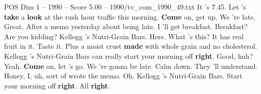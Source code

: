 \begin{textsample}{POS Dim 1 – 1990 – Score 5.00 – 1990/tv\_com\_1990\_49.txt}  \label{ex:f1_pos_053}
It 's 7.45.
Let 's \textbf{take} a \textbf{look} at the rush hour traffic this morning. \textbf{Come} on, get up.
We 're late.
Great.
After a memo yesterday about being late.
I 'll get breakfast.
Breakfast?
Are you kidding?
Kellogg 's Nutri-Grain Bars.
Here.
What 's this?
It has real fruit in it.
Taste it.
Plus a moist crust \textbf{made} with whole grain and no cholesterol.
Kellogg 's Nutri-Grain Bars can really start your morning off \textbf{right}.
Good, huh?
Yeah. \textbf{Come} on, let 's go.
We 're gonna be late.
Calm down.
They 'll understand.
Honey, I, uh, sort of wrote the memo.
Oh.
Kellogg 's Nutri-Grain Bars.
Start your morning off \textbf{right}.
All \textbf{right}.

\end{textsample}
